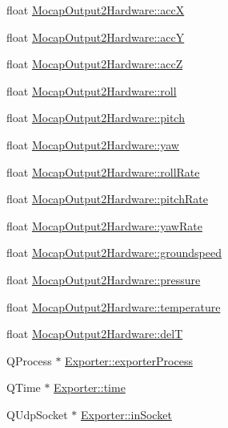 \begin{DoxyCompactItemize}
\item 
float \hyperlink{group___mo_cap_plugin_ga34811521a55099df3d905b19ab544638}{\-Mocap\-Output2\-Hardware\-::acc\-X}
\item 
float \hyperlink{group___mo_cap_plugin_gad47738d7c1cd424f7d9508b4d44a4043}{\-Mocap\-Output2\-Hardware\-::acc\-Y}
\item 
float \hyperlink{group___mo_cap_plugin_gae919304b20a26d362f67b32533118ce7}{\-Mocap\-Output2\-Hardware\-::acc\-Z}
\item 
float \hyperlink{group___mo_cap_plugin_ga6db93cd0e529bbfcb33af3293ab16c62}{\-Mocap\-Output2\-Hardware\-::roll}
\item 
float \hyperlink{group___mo_cap_plugin_ga5e6750ec09f6ef2ebd014c746421e952}{\-Mocap\-Output2\-Hardware\-::pitch}
\item 
float \hyperlink{group___mo_cap_plugin_ga423b4c125aa4c8caf1001d16de1dd3f9}{\-Mocap\-Output2\-Hardware\-::yaw}
\item 
float \hyperlink{group___mo_cap_plugin_ga178bcd8c81449eb7c9cc5c5bb203e591}{\-Mocap\-Output2\-Hardware\-::roll\-Rate}
\item 
float \hyperlink{group___mo_cap_plugin_ga03ecf7a98f0b6197c65a71fa1e2a1237}{\-Mocap\-Output2\-Hardware\-::pitch\-Rate}
\item 
float \hyperlink{group___mo_cap_plugin_gaddfb563223971f02a45ebd14034b2a06}{\-Mocap\-Output2\-Hardware\-::yaw\-Rate}
\item 
float \hyperlink{group___mo_cap_plugin_gab0735b3db4133ae25e01a4ee6dc3347f}{\-Mocap\-Output2\-Hardware\-::groundspeed}
\item 
float \hyperlink{group___mo_cap_plugin_ga521e946322d097a3b14b24f53ce1568f}{\-Mocap\-Output2\-Hardware\-::pressure}
\item 
float \hyperlink{group___mo_cap_plugin_gaa66ae80cf0902b622dea302a9a588fe8}{\-Mocap\-Output2\-Hardware\-::temperature}
\item 
float \hyperlink{group___mo_cap_plugin_ga0c6d6722adb60229659cfe26d61ec953}{\-Mocap\-Output2\-Hardware\-::del\-T}
\item 
\-Q\-Process $\ast$ \hyperlink{group___mo_cap_plugin_ga3e0f59d7efdaba4ae56afc474e929a17}{\-Exporter\-::exporter\-Process}
\item 
\-Q\-Time $\ast$ \hyperlink{group___mo_cap_plugin_gac71372aac301b0f6d2ae67c3a5c4be63}{\-Exporter\-::time}
\item 
\-Q\-Udp\-Socket $\ast$ \hyperlink{group___mo_cap_plugin_ga01c0037d3abe6f3cfc9521e865cbe65f}{\-Exporter\-::in\-Socket}
\item 

\end{DoxyCompactItemize}
